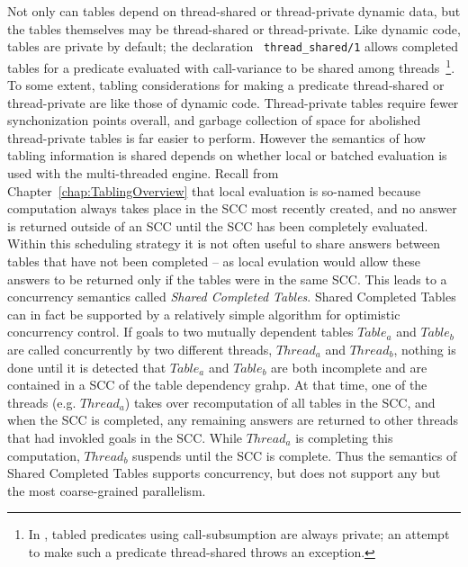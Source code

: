 Not only can tables depend on thread-shared or thread-private dynamic
data, but 
the tables themselves may be thread-shared or thread-private.  Like
dynamic code, tables are private by default; the declaration {\tt
  thread\_shared/1} allows completed tables for a predicate evaluated
with call-variance to be shared among threads~\footnote{In \version,
  tabled predicates using call-subsumption are always private; an
  attempt to make such a predicate thread-shared throws an
  exception.}.
%
To some extent, tabling considerations for making a predicate
thread-shared or thread-private are like those of dynamic code.
Thread-private tables require fewer synchonization points overall, and
garbage collection of space for abolished thread-private tables is far
easier to perform.  However the semantics of how tabling information
is shared depends on whether local or batched evaluation is used with
the multi-threaded engine.  Recall from
Chapter~\ref{chap:TablingOverview} that local evaluation is so-named
because computation always takes place in the SCC most recently
created, and no answer is returned outside of an SCC until the SCC has
been completely evaluated.  Within this scheduling strategy it is not
often useful to share answers between tables that have not been
completed -- as local evulation would allow these answers to be
returned only if the tables were in the same SCC.  This leads to a
concurrency semantics called {\em Shared Completed Tables}.  Shared
Completed Tables can in fact be supported by a relatively simple
algorithm for optimistic concurrency control.  If goals to two
mutually dependent tables $Table_a$ and $Table_b$ are called
concurrently by two different threads, $Thread_a$ and $Thread_b$,
nothing is done until it is detected that $Table_a$ and $Table_b$ are
both incomplete and are contained in a SCC of the table dependency
grahp.  At that time, one of the threads (e.g. $Thread_a$) takes over
recomputation of all tables in the SCC, and when the SCC is completed,
any remaining answers are returned to other threads that had invokled
goals in the SCC.  While $Thread_a$ is completing this computation,
$Thread_b$ suspends until the SCC is complete.  Thus the semantics of
Shared Completed Tables supports concurrency, but does not support any
but the most coarse-grained parallelism.

